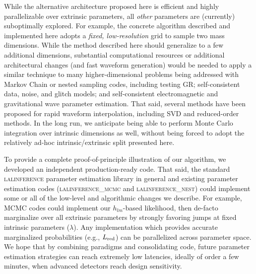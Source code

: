 


While the alternative architecture proposed here is efficient and highly parallelizable over extrinsic parameters,
all \emph{other}  parameters are (currently) suboptimally explored.  
For example, the concrete algorithm described and implemented here adopts a \emph{fixed, low-resolution} grid to sample
 two mass dimensions.  
%
While the method described here should generalize to a few additional dimensions, substantial computational resources or
additional architectural changes (and fast waveform generation) would be needed to apply a similar technique to many higher-dimensional problems being addressed with Markov
Chain or nested sampling codes, including testing GR; self-consistent data, noise,  and glitch models;  and self-consistent
electromagnetic and gravitational wave parameter estimation.   
That said,  several methods have been proposed for rapid waveform interpolation, including SVD and reduced-order
methods.  In the long run, we  anticipate being able to perform Monte Carlo integration over intrinsic dimensions as
well, without being forced  to adopt the relatively ad-hoc intrinsic/extrinsic split presented here.  
%

To provide a complete proof-of-principle illustration of our algorithm, we developed an independent production-ready
code.  That said,  the standard \textsc{lalinference} parameter estimation library in general and existing parameter
estimation codes (\textsc{lalinference\_mcmc} and \textsc{lalinference\_nest}) could  implement some or all of the
low-level and algorithmic changes we describe.  For example, MCMC codes could implement our $h_{lm}$-based likelihood,
then de-facto
 marginalize over all extrinsic parameters by strongly favoring jumps at fixed intrinsic parameters ($\lambda$).
Any  implementation which provides accurate marginalized probabilities (e.g., $L_{\rm red}$) can be parallelized across parameter
space.  
%
%
We hope  that by combining paradigms and consolidating code, future parameter estimation
strategies can reach extremely low latencies, ideally of order a few minutes, when advanced detectors reach design sensitivity. 
